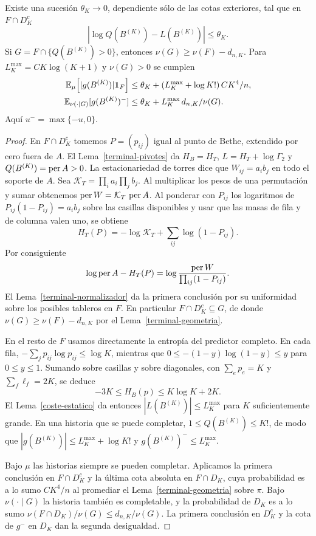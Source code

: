 \begin{proposicion}\label{terminal-error}
Existe una sucesión $\theta_K\to0$, dependiente sólo de las cotas exteriores, tal que en
$F\cap D_K^c$
\[
 |\log Q(B^{(K)})-L(B^{(K)})|\le\theta_K .
\]
Si $G=F\cap\{Q(B^{(K)})>0\}$, entonces $\nu(G)\ge\nu(F)-d_{n,K}$. Para $L_K^{\max}=C K\log(K+1)$ y
$\nu(G)>0$ se cumplen
\[
 \begin{aligned}
 \mathbb{E}_\mu\!\left[|g(B^{(K)})|\mathbf1_F\right]
 &\le\theta_K+(L_K^{\max}+\log K!)\, CK^4/n,\\
 \mathbb{E}_{\nu(\cdot\mid G)}[g(B^{(K)})^-]
 &\le\theta_K+L_K^{\max}\,d_{n,K}/\nu(G).
 \end{aligned}
\]
Aquí $u^-=\max\{-u,0\}$.
\end{proposicion}
\begin{proof}
En $F\cap D_K^c$ tomemos $P=(p_{ij})$ igual al punto de Bethe, extendido por cero fuera de $A$. El
Lema~\ref{terminal-pivotes} da $H_B=H_T$, $L=H_T+\log\Gamma_2$ y $Q(B^{(K)})=\operatorname{per} A>0$. La estacionariedad
de torres dice que $W_{ij}=a_i b_j$ en todo el soporte de $A$. Sea
$\mathcal K_T=\prod_i a_i\prod_j b_j$.
Al multiplicar los pesos de una permutación y sumar obtenemos $\operatorname{per} W=\mathcal K_T\,\operatorname{per} A$. Al
ponderar con $P_{ij}$ los logaritmos de $P_{ij}(1-P_{ij})=a_i b_j$ sobre las casillas disponibles y
usar que las masas de fila y de columna valen uno, se obtiene
\[
 H_T(P)=-\log\mathcal K_T+\sum_{ij}\log(1-P_{ij}).
\]
Por consiguiente
\[
 \log\operatorname{per} A-H_T(P)
 =\log\frac{\operatorname{per} W}{\prod_{ij}(1-P_{ij})}.
\]
El Lema~\ref{terminal-normalizador} da la primera conclusión por su uniformidad sobre los posibles
tableros en $F$. En particular $F\cap D_K^c\subseteq G$, de donde $\nu(G)\ge\nu(F)-d_{n,K}$ por el
Lema~\ref{terminal-geometria}.

En el resto de $F$ usamos directamente la entropía del predictor completo. En cada fila, $-\sum_j
p_{ij}\log p_{ij}\le\log K$, mientras que $0\le -(1-y)\log(1-y)\le y$ para $0\le y\le1$. Sumando sobre
casillas y sobre diagonales, con $\sum_e p_e=K$ y $\sum_f\ell_f=2K$, se deduce
\[
 -3K\le H_B(p)\le K\log K+2K .
\]
El Lema~\ref{coste-estatico} da entonces $|L(B^{(K)})|\le L_K^{\max}$ para $K$ suficientemente grande.
En una historia que se puede completar, $1\le Q(B^{(K)})\le K!$, de modo que
$|g(B^{(K)})|\le L_K^{\max}+\log K!$ y $g(B^{(K)})^-\le L_K^{\max}$.

Bajo $\mu$ las historias siempre se pueden completar. Aplicamos la primera conclusión en $F\cap D_K^c$
y la última cota absoluta en $F\cap D_K$, cuya probabilidad es a lo sumo $CK^4/n$ al promediar el
Lema~\ref{terminal-geometria} sobre $\pi$. Bajo $\nu(\cdot\mid G)$ la historia también es completable,
y la probabilidad de $D_K$ es a lo sumo $\nu(F\cap D_K)/\nu(G)\le d_{n,K}/\nu(G)$. La primera
conclusión en $D_K^c$ y la cota de $g^-$ en $D_K$ dan la segunda desigualdad.
\end{proof}
